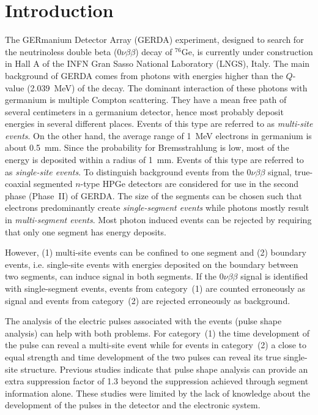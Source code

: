 \documentclass[epj]{svjour}
\begin{document}
\section{Introduction}
\label{s:intro}
The GERmanium Detector Array (GERDA) experiment, designed to search
for the neutrinoless double beta ($0\nu\beta\beta$) decay of
$^{76}$Ge, is currently under construction in Hall A of the INFN Gran
Sasso National Laboratory (LNGS), Italy. \cite{Abt04,Sch05} The main
background of GERDA comes from photons with energies higher than the
$Q$-value (2.039~MeV) of the decay. The dominant interaction of these
photons with germanium is multiple Compton scattering. They have a
mean free path of several centimeters in a germanium detector, hence
most probably deposit energies in several different places. Events of
this type are referred to as \emph{multi-site events}. On the other
hand, the average range of 1~MeV electrons in germanium is about
0.5~mm. Since the probability for Bremsstrahlung is low, most of the
energy is deposited within a radius of 1~mm. Events of this type are
referred to as \emph{single-site events}. To distinguish background
events from the $0\nu\beta\beta$ signal, true-coaxial segmented
$n$-type HPGe detectors are considered for use in the second phase
(Phase~II) of GERDA. The size of the segments can be chosen such that
electrons predominantly create \emph{single-segment events} while
photons mostly result in \emph{multi-segment events}. Most photon
induced events can be rejected by requiring that only one segment has
energy deposits. \cite{photon}

However, (1) multi-site events can be confined to one segment and (2)
boundary events, i.e. single-site events with energies deposited on
the boundary between two segments, can induce signal in both
segments. If the $0\nu\beta\beta$ signal is identified with
single-segment events, events from category~(1) are counted
erroneously as signal and events from category~(2) are rejected
erroneously as background.

The analysis of the electric pulses associated with the events (pulse
shape analysis) can help with both problems. For category~(1) the time
development of the pulse can reveal a multi-site event while for
events in category~(2) a close to equal strength and time development
of the two pulses can reveal its true single-site structure. Previous
studies \cite{psa} indicate that pulse shape analysis can provide an
extra suppression factor of 1.3 beyond the suppression achieved
through segment information alone. These studies were limited by the
lack of knowledge about the development of the pulses in the detector
and the electronic system.
\end{document}
